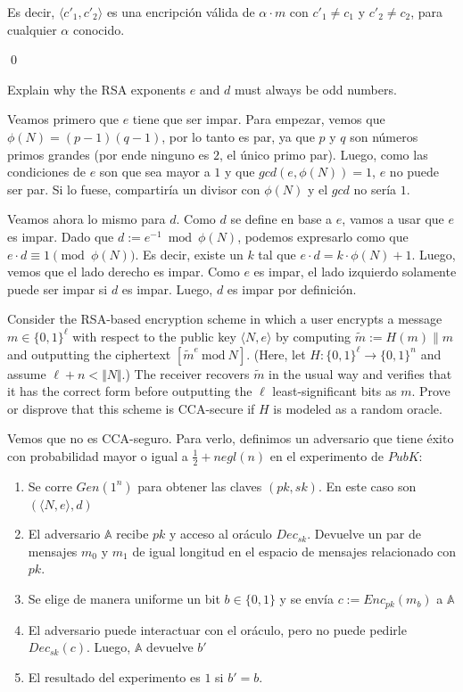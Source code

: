 \documentclass[12pt,addpoints,answers]{exam}
\begin{document}
\begin{questions}
\begin{solution}
  Es decir, $\langle c'_1, c'_2\rangle$ es una encripción válida de $\alpha \cdot m$ con $c'_1 \neq c_1$ y $c'_2 \neq c_2$, para cualquier $\alpha$ conocido.

  \qed

\end{solution}


\question[10] Explain why the RSA exponents $e$ and $d$ must always be odd numbers.
\begin{solution}
  Veamos primero que $e$ tiene que ser impar. Para empezar, vemos que $\phi(N) = (p-1)(q-1)$, por lo tanto es par, ya que $p$ y $q$ son números primos grandes (por ende ninguno es $2$, el único primo par). Luego, como las condiciones de $e$ son que sea mayor a $1$ y que $gcd(e, \phi(N)) = 1$, $e$ no puede ser par. Si lo fuese, compartiría un divisor con $\phi(N)$ y el $gcd$ no sería $1$. 

  Veamos ahora lo mismo para $d$. Como $d$ se define en base a $e$, vamos a usar que $e$ es impar. Dado que $d := e^{-1} \bmod \phi(N)$, podemos expresarlo como que $e \cdot d \equiv 1 \pmod{\phi(N)}$. Es decir, existe un $k$ tal que $e \cdot d = k \cdot \phi(N) + 1$. Luego, vemos que el lado derecho es impar. Como $e$ es impar, el lado izquierdo solamente puede ser impar si $d$ es impar. Luego, $d$ es impar por definición.
\end{solution}


\question[10] Consider the RSA-based encryption scheme in which a user encrypts a message $m\in\{0,1\}^\ell$ with respect to the public key $\langle N,e\rangle$ by computing $\tilde{m}:=H(m)\parallel m$ and outputting the ciphertext $[\tilde{m}^e~\mathrm{mod}~N]$. (Here, let $H:\{0,1\}^\ell\rightarrow\{0,1\}^n$ and assume $\ell+n<\Vert N\Vert$.) The receiver recovers $\tilde{m}$ in the usual way and verifies that it has the correct form before outputting the $\ell$ least-significant bits as $m$. Prove or disprove that this scheme is CCA-secure if $H$ is modeled as a random oracle.
\begin{solution}
  Vemos que no es CCA-seguro. Para verlo, definimos un adversario que tiene éxito con probabilidad mayor o igual a $\frac{1}{2} + negl(n)$ en el experimento de $PubK$:
  \begin{enumerate}
    \item Se corre $Gen(1^n)$ para obtener las claves $(pk, sk)$. En este caso son $(\langle N, e\rangle, d)$
    \item El adversario $\mathbb{A}$ recibe $pk$ y acceso al oráculo $Dec_{sk}$. Devuelve un par de mensajes $m_0$ y $m_1$ de igual longitud en el espacio de mensajes relacionado con $pk$.
    \item Se elige de manera uniforme un bit $b \in \{0, 1\}$ y se envía $c := Enc_{pk}(m_b)$ a $\mathbb{A}$
    \item El adversario puede interactuar con el oráculo, pero no puede pedirle $Dec_{sk}(c)$. Luego, $\mathbb{A}$ devuelve $b'$
    \item El resultado del experimento es $1$ si $b' = b$. 
  \end{enumerate}


\end{solution}
\end{questions}
\end{document}
